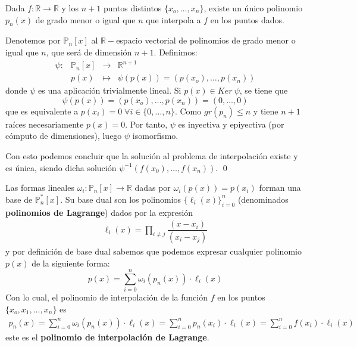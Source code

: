         \begin{teo}
        
        Dada $f: \mathbb{R} \longrightarrow \mathbb{R}$ y los $n+1$ puntos distintos $\{x_o, \ldots, x_n\}$, existe un {\'u}nico polinomio $p_n(x)$ de grado menor o igual que $n$ que interpola a $f$ en los puntos dados.
        \end{teo}
        
        \begin{dem}
        
        Denotemos por $\mathbb{P}_n[x]$ al $\mathbb{R}-$espacio vectorial de polinomios de grado menor o igual que $n$, que será de dimensi{\'o}n $n+1$. Definimos:
        $$\begin{array}{rrcl}
            \psi : & \mathbb{P}_n[x] & \longrightarrow & \mathbb{R}^{n+1} \\
            \: & p(x) & \longmapsto & \psi(p(x))=(p(x_o), \ldots, p(x_n)) 
        \end{array}$$
        donde $\psi$ es una aplicaci{\'o}n trivialmente lineal. Si $p(x) \in Ker \: \psi$, se tiene que
        $$\psi(p(x))=(p(x_o), \ldots, p(x_n)) = (0, \ldots, 0)$$
        que es equivalente a  $p(x_i)=0 \; \forall i \in \{0, \ldots, n\}$. Como $gr(p_n) \leq n$ y tiene $n+1$ ra{\'i}ces necesariamente $p(x)=0$. Por tanto, $\psi$ es inyectiva y epiyectiva (por c{\'o}mputo de dimensiones), luego $\psi$ isomorfismo. 
        
        Con esto podemos concluir que la solución al problema de interpolación existe y es única, siendo dicha solución $\psi^{-1}(f(x_0),\ldots,f(x_n))$.
        \qed\end{dem}
        \begin{cor}
        Las formas lineales $\omega_i:\mathbb{P}_n[x]\rightarrow\mathbb{R}$ dadas por $\omega_i(p(x))=p(x_i)$ forman una base de $\mathbb{P}^*_n[x]$. Su base dual son los polinomios $\{\ell_i(x)\}_{i=0}^n$ (denominados \textbf{polinomios de Lagrange}) dados por la expresión
        \begin{align}
         \ell_i(x)=\prod_{i \neq j} \dfrac{(x-x_i)}{(x_i-x_j)}   
         \label{pol:lag}
        \end{align}
        y por definición de base dual sabemos que podemos expresar cualquier polinomio $p(x)$ de la siguiente forma:
        $$p(x)=\sum_{i=0}^n \omega_i(p_n(x))\cdot  \ell_i(x)$$
        Con lo cual, el polinomio de interpolación de la función $f$ en los puntos $\{x_o,x_1,\ldots,x_n\}$ es
        \begin{align}
        p_n(x)=\sum_{i=0}^n \omega_i(p_n(x))\cdot  \ell_i(x)=\sum_{i=0}^n p_n(x_i)\cdot  \ell_i(x)=\sum_{i=0}^n f(x_i)\cdot  \ell_i(x)
        \label{pol:lagrange}
        \end{align}
        este es el \textbf{polinomio de interpolación de Lagrange}.
        \end{cor}
